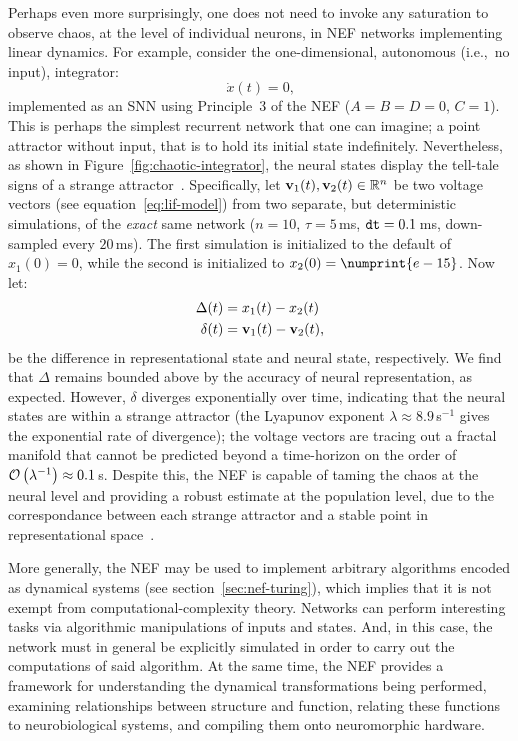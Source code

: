 Perhaps even more surprisingly, one does not need to invoke any saturation to observe chaos, at the level of individual neurons, in NEF networks implementing linear dynamics.
For example, consider the one-dimensional, autonomous (i.e.,~no input), integrator:
$$\dot{x}(t) = 0 \text{,}$$
implemented as an SNN using Principle~3 of the NEF ($A = B = D = 0$, $C = 1$).
This is perhaps the simplest recurrent network that one can imagine; a point attractor without input, that is to hold its initial state indefinitely.
Nevertheless, as shown in Figure~\ref{fig:chaotic-integrator}, the neural states display the tell-tale signs of a strange attractor~\citep[cf.~][Figure~9.3.5]{strogatz2000nonlinear}.
Specifically, let $\mathbf{v}_1(t), \mathbf{v}_2(t) \in \mathbb{R}^n$ be two voltage vectors (see equation~\ref{eq:lif-model}) from two separate, but deterministic simulations, of the \emph{exact} same network ($n = 10$, $\tau = 5$\,ms, $\texttt{dt}{} = 0.1$\,ms, down-sampled every $20$\,ms).
The first simulation is initialized to the default of $x_1(0) = 0$, while the second is initialized to $x_2(0) = \numprint{e-15}$.
Now let:
\begin{align*}
\Delta(t) &= x_1(t) - x_2(t) \\
\delta(t) &= \mathbf{v}_1(t) - \mathbf{v}_2(t) \text{,}
\end{align*}
be the difference in representational state and neural state, respectively.
We find that $\Delta$ remains bounded above by the accuracy of neural representation, as expected.
However, $\delta$ diverges exponentially over time, indicating that the neural states are within a strange attractor (the Lyapunov exponent $\lambda \approx 8.9$\,s${}^{-1}$ gives the exponential rate of divergence); the voltage vectors are tracing out a fractal manifold that cannot be predicted beyond a time-horizon on the order of $\mathcal{O}\left({\lambda^{-1}}\right) \approx 0.1$\,s.
Despite this, the NEF is capable of taming the chaos at the neural level and providing a robust estimate at the population level, due to the correspondance between each strange attractor and a stable point in representational space~\citep[][p.~237]{eliasmith2003a}.

More generally, the NEF may be used to implement arbitrary algorithms encoded as dynamical systems (see section~\ref{sec:nef-turing}), which implies that it is not exempt from computational-complexity theory. 
Networks can perform interesting tasks via algorithmic manipulations of inputs and states.
And, in this case, the network must in general be explicitly simulated in order to carry out the computations of said algorithm.
At the same time, the NEF provides a framework for understanding the dynamical transformations being performed, examining relationships between structure and function, relating these functions to neurobiological systems, and compiling them onto neuromorphic hardware.

